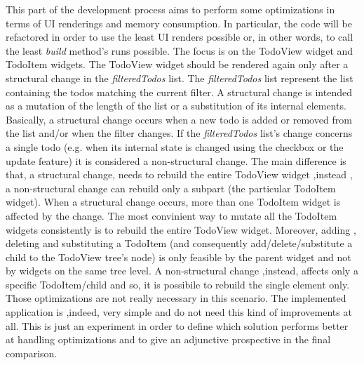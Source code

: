 
This part of the development process aims to perform some optimizations in terms of UI renderings and memory consumption. In particular, the code will be refactored in order to use the least UI renders possible or, in other words, to call the least \textit{build} method's runs possible. The focus is on the TodoView widget and TodoItem widgets. The TodoView widget should be rendered again only after a structural change in the \textit{filteredTodos} list. The \textit{filteredTodos }list represent the list containing the todos matching the current filter. A structural change is intended as a mutation of the length of the list or a substitution of its internal elements. Basically, a structural change occurs when a new todo is added or removed from the list and/or when the filter changes. If the \textit{filteredTodos} list's change concerns a single todo (e.g. when its internal state is changed using the checkbox or the update feature) it is considered a non-structural change. The main difference is that, a structural change, needs to rebuild the entire TodoView widget ,instead , a non-structural change can rebuild only a subpart (the particular TodoItem widget). When a structural change occurs, more than one TodoItem widget is affected by the change. The most convinient way to mutate all the TodoItem widgets consistently is to rebuild the entire TodoView widget. Moreover, adding , deleting and substituting a TodoItem (and consequently add/delete/substitute a child to the TodoView tree's node) is only feasible by the parent widget and not by widgets on the same tree level. A non-structural change ,instead, affects only a specific TodoItem/child and so, it is possibile to rebuild the single element only. Those optimizations are not really necessary in this scenario. The implemented application is ,indeed, very simple and do not need this kind of improvements at all. This is just an experiment in order to define which solution performs better at handling optimizations and to give an adjunctive prospective in the final comparison.